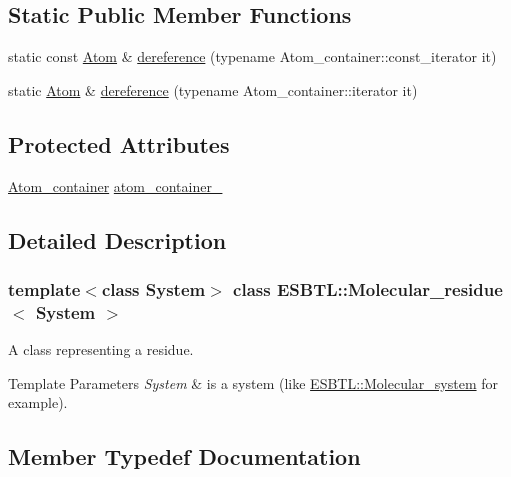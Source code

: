 \subsection*{Static Public Member Functions}
\begin{DoxyCompactItemize}
\item 
static const \hyperlink{classESBTL_1_1Molecular__residue_ac48ca38f130266b0403df294bff016ae}{Atom} \& \hyperlink{classESBTL_1_1Molecular__residue_aaaaa5a9111e9b1d35fedba1a9211dc86}{dereference} (typename Atom\+\_\+container\+::const\+\_\+iterator it)
\item 
static \hyperlink{classESBTL_1_1Molecular__residue_ac48ca38f130266b0403df294bff016ae}{Atom} \& \hyperlink{classESBTL_1_1Molecular__residue_a41c485c4121b1fe4e753b18c22048b19}{dereference} (typename Atom\+\_\+container\+::iterator it)
\end{DoxyCompactItemize}
\subsection*{Protected Attributes}
\begin{DoxyCompactItemize}
\item 
\hyperlink{classESBTL_1_1Molecular__residue_af354df2c3267d075215464cd408b8d78}{Atom\+\_\+container} \hyperlink{classESBTL_1_1Molecular__residue_a91a04d48586a8e07c80837e9e871183b}{atom\+\_\+container\+\_\+}
\end{DoxyCompactItemize}


\subsection{Detailed Description}
\subsubsection*{template$<$class System$>$\newline
class E\+S\+B\+T\+L\+::\+Molecular\+\_\+residue$<$ System $>$}

A class representing a residue. 
\begin{DoxyTemplParams}{Template Parameters}
{\em System} & is a system (like \hyperlink{classESBTL_1_1Molecular__system}{E\+S\+B\+T\+L\+::\+Molecular\+\_\+system} for example). \\
\hline
\end{DoxyTemplParams}


\subsection{Member Typedef Documentation}
\mbox{\label{classESBTL_1_1Molecular__residue_ac48ca38f130266b0403df294bff016ae}} 
